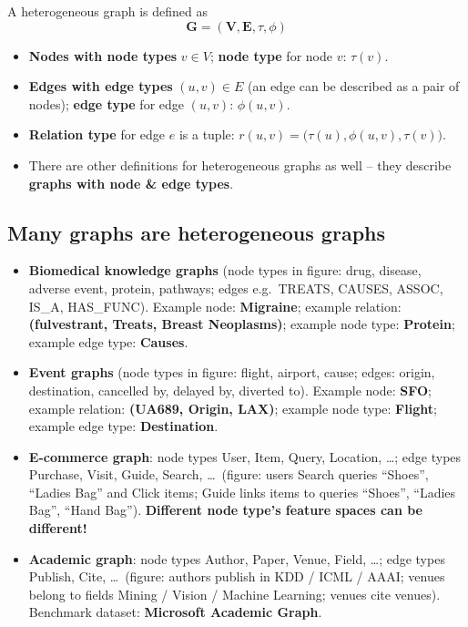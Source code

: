 \begin{definition}\label{def:lec09-hetero}
  A heterogeneous graph is defined as
  \begin{equation}\label{eq:lec09-hetero}
    \bm{G} = (\bm{V}, \bm{E}, \tau, \phi)
  \end{equation}
  \begin{itemize}
    \item \textbf{Nodes with node types} $v\in V$; \textbf{node type} for node
      $v$: $\tau(v)$.
    \item \textbf{Edges with edge types} $(u,v)\in E$ (an edge can be described
      as a pair of nodes); \textbf{edge type} for edge $(u,v)$: $\phi(u,v)$.
    \item \textbf{Relation type} for edge $e$ is a tuple:
      $r(u,v) = \big(\tau(u), \phi(u,v), \tau(v)\big)$.
  \end{itemize}
\end{definition}
\begin{itemize}
  \item There are other definitions for heterogeneous graphs as well -- they
    describe \textbf{graphs with node \& edge types}.
\end{itemize}

\subsection{Many graphs are heterogeneous graphs}\label{sec:lec09-examples}

\begin{itemize}
  \item \textbf{Biomedical knowledge graphs} (node types in figure: drug,
    disease, adverse event, protein, pathways; edges e.g.\ TREATS, CAUSES,
    ASSOC, IS\_A, HAS\_FUNC). Example node: \textbf{Migraine}; example relation:
    \textbf{(fulvestrant, Treats, Breast Neoplasms)}; example node type:
    \textbf{Protein}; example edge type: \textbf{Causes}.
  \item \textbf{Event graphs} (node types in figure: flight, airport, cause;
    edges: origin, destination, cancelled by, delayed by, diverted to). Example
    node: \textbf{SFO}; example relation: \textbf{(UA689, Origin, LAX)}; example
    node type: \textbf{Flight}; example edge type: \textbf{Destination}.
  \item \textbf{E-commerce graph}: node types User, Item, Query, Location,
    \dots; edge types Purchase, Visit, Guide, Search, \dots\ (figure: users
    Search queries ``Shoes'', ``Ladies Bag'' and Click items; Guide links items
    to queries ``Shoes'', ``Ladies Bag'', ``Hand Bag''). \textbf{Different node
    type's feature spaces can be different!}
  \item \textbf{Academic graph}: node types Author, Paper, Venue, Field, \dots;
    edge types Publish, Cite, \dots\ (figure: authors publish in KDD / ICML /
    AAAI; venues belong to fields Mining / Vision / Machine Learning; venues
    cite venues). Benchmark dataset: \textbf{Microsoft Academic Graph}.
\end{itemize}

